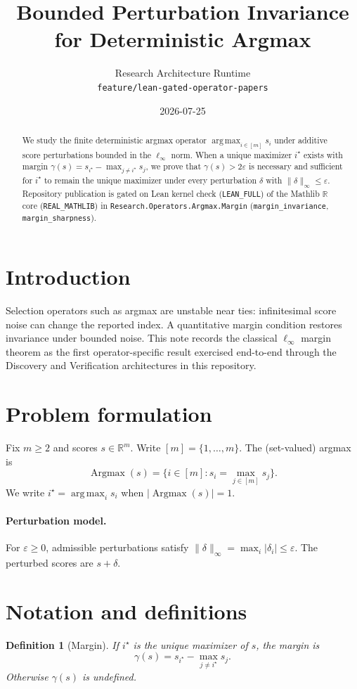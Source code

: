 \documentclass[11pt]{article}
\title{Bounded Perturbation Invariance for Deterministic Argmax}
\author{Research Architecture Runtime \\ \texttt{feature/lean-gated-operator-papers}}
\date{2026-07-25}
\newtheorem{definition}[theorem]{Definition}
\begin{document}
\maketitle

\begin{abstract}
We study the finite deterministic argmax operator
\(\operatorname*{arg\,max}_{i\in[m]} s_i\) under additive score perturbations
bounded in the \(\ell_\infty\) norm.
When a unique maximizer \(i^\star\) exists with margin
\(\gamma(s)=s_{i^\star}-\max_{j\neq i^\star}s_j\), we prove that
\(\gamma(s)>2\varepsilon\) is necessary and sufficient for \(i^\star\) to remain
the unique maximizer under every perturbation \(\delta\) with
\(\|\delta\|_\infty\le\varepsilon\).
Repository publication is gated on Lean kernel check
(\texttt{LEAN\_FULL}) of the Mathlib $\mathbb{R}$ core (\texttt{REAL\_MATHLIB}) in
\texttt{Research.Operators.Argmax.Margin}
(\texttt{margin\_invariance}, \texttt{margin\_sharpness}).
\end{abstract}

\section{Introduction}
Selection operators such as argmax are unstable near ties:
infinitesimal score noise can change the reported index.
A quantitative margin condition restores invariance under bounded noise.
This note records the classical \(\ell_\infty\) margin theorem as the first
operator-specific result exercised end-to-end through the Discovery and
Verification architectures in this repository.

\section{Problem formulation}
Fix \(m\ge 2\) and scores \(s\in\mathbb{R}^m\).
Write \([m]=\{1,\dots,m\}\).
The (set-valued) argmax is
\[
\operatorname*{Argmax}(s)=\bigl\{i\in[m]: s_i=\max_{j\in[m]} s_j\bigr\}.
\]
We write \(i^\star=\operatorname*{arg\,max}_i s_i\) when
\(\lvert\operatorname*{Argmax}(s)\rvert=1\).

\paragraph{Perturbation model.}
For \(\varepsilon\ge 0\), admissible perturbations satisfy
\(\|\delta\|_\infty=\max_i\lvert\delta_i\rvert\le\varepsilon\).
The perturbed scores are \(s+\delta\).

\section{Notation and definitions}
\begin{definition}[Margin]
If \(i^\star\) is the unique maximizer of \(s\), the margin is
\[
\gamma(s)=s_{i^\star}-\max_{j\neq i^\star}s_j.
\]
Otherwise \(\gamma(s)\) is undefined.
\end{definition}
\end{document}
